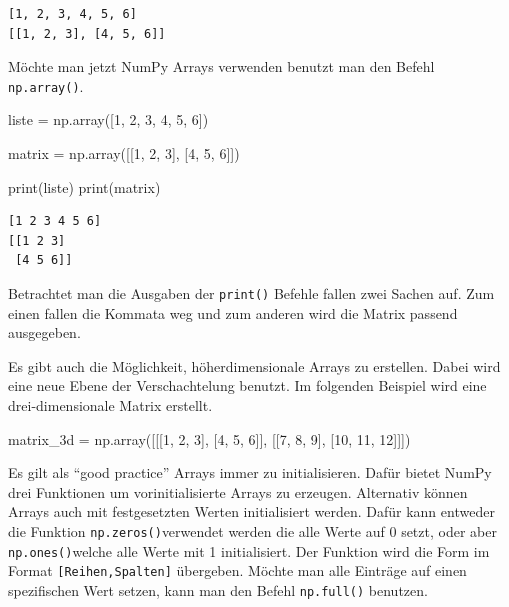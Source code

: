 \documentclass[
  letterpaper,
  DIV=11,
  numbers=noendperiod]{scrreprt}
\newenvironment{Shaded}{\begin{snugshade}}{\end{snugshade}}
\newcommand{\BuiltInTok}[1]{\textcolor[rgb]{0.00,0.23,0.31}{#1}}
\newcommand{\DecValTok}[1]{\textcolor[rgb]{0.68,0.00,0.00}{#1}}
\newcommand{\NormalTok}[1]{\textcolor[rgb]{0.00,0.23,0.31}{#1}}
\newcommand{\OperatorTok}[1]{\textcolor[rgb]{0.37,0.37,0.37}{#1}}
\begin{document}
\begin{verbatim}
[1, 2, 3, 4, 5, 6]
[[1, 2, 3], [4, 5, 6]]
\end{verbatim}

Möchte man jetzt NumPy Arrays verwenden benutzt man den Befehl
\texttt{np.array()}.

\begin{Shaded}
\begin{Highlighting}[]
\NormalTok{liste }\OperatorTok{=}\NormalTok{ np.array([}\DecValTok{1}\NormalTok{, }\DecValTok{2}\NormalTok{, }\DecValTok{3}\NormalTok{, }\DecValTok{4}\NormalTok{, }\DecValTok{5}\NormalTok{, }\DecValTok{6}\NormalTok{])}

\NormalTok{matrix }\OperatorTok{=}\NormalTok{ np.array([[}\DecValTok{1}\NormalTok{, }\DecValTok{2}\NormalTok{, }\DecValTok{3}\NormalTok{], [}\DecValTok{4}\NormalTok{, }\DecValTok{5}\NormalTok{, }\DecValTok{6}\NormalTok{]])}

\BuiltInTok{print}\NormalTok{(liste)}
\BuiltInTok{print}\NormalTok{(matrix)}
\end{Highlighting}
\end{Shaded}

\begin{verbatim}
[1 2 3 4 5 6]
[[1 2 3]
 [4 5 6]]
\end{verbatim}

Betrachtet man die Ausgaben der \texttt{print()} Befehle fallen zwei
Sachen auf. Zum einen fallen die Kommata weg und zum anderen wird die
Matrix passend ausgegeben.

Es gibt auch die Möglichkeit, höherdimensionale Arrays zu erstellen.
Dabei wird eine neue Ebene der Verschachtelung benutzt. Im folgenden
Beispiel wird eine drei-dimensionale Matrix erstellt.

\begin{Shaded}
\begin{Highlighting}[]
\NormalTok{matrix\_3d }\OperatorTok{=}\NormalTok{ np.array([[[}\DecValTok{1}\NormalTok{, }\DecValTok{2}\NormalTok{, }\DecValTok{3}\NormalTok{], [}\DecValTok{4}\NormalTok{, }\DecValTok{5}\NormalTok{, }\DecValTok{6}\NormalTok{]], [[}\DecValTok{7}\NormalTok{, }\DecValTok{8}\NormalTok{, }\DecValTok{9}\NormalTok{], [}\DecValTok{10}\NormalTok{, }\DecValTok{11}\NormalTok{, }\DecValTok{12}\NormalTok{]]])}
\end{Highlighting}
\end{Shaded}

Es gilt als ``good practice'' Arrays immer zu initialisieren. Dafür
bietet NumPy drei Funktionen um vorinitialisierte Arrays zu erzeugen.
Alternativ können Arrays auch mit festgesetzten Werten initialisiert
werden. Dafür kann entweder die Funktion \texttt{np.zeros()}verwendet
werden die alle Werte auf 0 setzt, oder aber \texttt{np.ones()}welche
alle Werte mit 1 initialisiert. Der Funktion wird die Form im Format
\texttt{{[}Reihen,Spalten{]}} übergeben. Möchte man alle Einträge auf
einen spezifischen Wert setzen, kann man den Befehl \texttt{np.full()}
benutzen.
\end{document}
